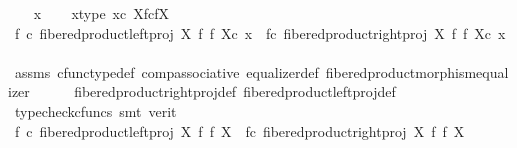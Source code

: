 \begin{isabellebody}
\ \ \isamarkupfalse%
\ x\isanewline
\ \ \isamarkupfalse%
\ x{\isacharunderscore}{\kern0pt}type{\isacharcolon}{\kern0pt}\ {\isachardoublequoteopen}x{\isasymin}\isactrlsub c\ X\isactrlbsub f\isactrlesub {\isasymtimes}\isactrlsub c\isactrlbsub f\isactrlesub X{\isachardoublequoteclose}\isanewline
\ \ \isamarkupfalse%
\ \isamarkupfalse%
\ {\isachardoublequoteopen}{\isacharparenleft}{\kern0pt}f\ {\isasymcirc}\isactrlsub c\ {\isacharparenleft}{\kern0pt}fibered{\isacharunderscore}{\kern0pt}product{\isacharunderscore}{\kern0pt}left{\isacharunderscore}{\kern0pt}proj\ X\ f\ f\ X{\isacharparenright}{\kern0pt}{\isacharparenright}{\kern0pt}{\isasymcirc}\isactrlsub c\ x\ {\isacharequal}{\kern0pt}\ {\isacharparenleft}{\kern0pt}f{\isasymcirc}\isactrlsub c\ {\isacharparenleft}{\kern0pt}fibered{\isacharunderscore}{\kern0pt}product{\isacharunderscore}{\kern0pt}right{\isacharunderscore}{\kern0pt}proj\ X\ f\ f\ X{\isacharparenright}{\kern0pt}{\isacharparenright}{\kern0pt}{\isasymcirc}\isactrlsub c\ x{\isachardoublequoteclose}\isanewline
\ \ \ \ \isamarkupfalse%
\ assms\ cfunc{\isacharunderscore}{\kern0pt}type{\isacharunderscore}{\kern0pt}def\ comp{\isacharunderscore}{\kern0pt}associative\ equalizer{\isacharunderscore}{\kern0pt}def\ fibered{\isacharunderscore}{\kern0pt}product{\isacharunderscore}{\kern0pt}morphism{\isacharunderscore}{\kern0pt}equalizer\isanewline
\ \ \ \ \isamarkupfalse%
\ fibered{\isacharunderscore}{\kern0pt}product{\isacharunderscore}{\kern0pt}right{\isacharunderscore}{\kern0pt}proj{\isacharunderscore}{\kern0pt}def\ fibered{\isacharunderscore}{\kern0pt}product{\isacharunderscore}{\kern0pt}left{\isacharunderscore}{\kern0pt}proj{\isacharunderscore}{\kern0pt}def\isanewline
\ \ \ \ \isamarkupfalse%
\ {\isacharparenleft}{\kern0pt}typecheck{\isacharunderscore}{\kern0pt}cfuncs{\isacharcomma}{\kern0pt}\ smt\ {\isacharparenleft}{\kern0pt}verit{\isacharparenright}{\kern0pt}{\isacharparenright}{\kern0pt}\isanewline
\ \ \isamarkupfalse%
\ \isamarkupfalse%
\ {\isachardoublequoteopen}f\ {\isasymcirc}\isactrlsub c\ {\isacharparenleft}{\kern0pt}fibered{\isacharunderscore}{\kern0pt}product{\isacharunderscore}{\kern0pt}left{\isacharunderscore}{\kern0pt}proj\ X\ f\ f\ X{\isacharparenright}{\kern0pt}\ {\isacharequal}{\kern0pt}\ f{\isasymcirc}\isactrlsub c\ {\isacharparenleft}{\kern0pt}fibered{\isacharunderscore}{\kern0pt}product{\isacharunderscore}{\kern0pt}right{\isacharunderscore}{\kern0pt}proj\ X\ f\ f\ X{\isacharparenright}{\kern0pt}{\isachardoublequoteclose}\isanewline

\end{isabellebody}
